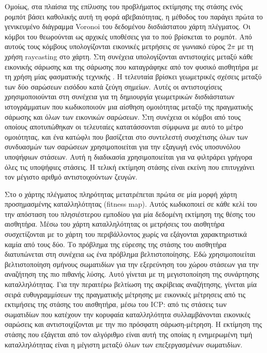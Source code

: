 Ομοίως, στα πλαίσια της επίλυσης του προβλήματος εκτίμησης της στάσης ενός
ρομπότ βάσει καθολικής αυτή τη φορά αβεβαιότητας, η μέθοδος του
\cite{Park2014a} παράγει πρώτα το γενικευμένο διάγραμμα Voronoi του δεδομένου
δισδιάστατου χάρτη πλέγματος. Οι κόμβοι του θεωρούνται ως αρχικές υποθέσεις για
το πού βρίσκεται το ρομπότ. Από αυτούς τους κόμβους υπολογίζονται εικονικές
μετρήσεις σε γωνιακό εύρος $2\pi$ με τη χρήση raycasting στο χάρτη. Στη
συνέχεια υπολογίζονται αντιστοιχίες μεταξύ κάθε εικονικής σάρωσης και της
σάρωσης που καταγράφηκε από τον φυσικό αισθητήρα με τη χρήση μίας φασματικής
τεχνικής \cite{Leordeanu2005a}. Η τελευταία βρίσκει γεωμετρικές σχέσεις μεταξύ
των δύο σαρώσεων εισόδου κατά ζεύγη σημείων. Αυτές οι αντιστοιχίσεις
χρησιμοποιούνται στη συνέχεια για τη δημιουργία γεωμετρικών δισδιάστατων
ιστογράμματων που κωδικοποιούν μια αίσθηση ομοιότητας μεταξύ της πραγματικής
σάρωσης και όλων των εικονικών σαρώσεων. Στη συνέχεια οι κόμβοι από τους
οποίους αποτυπώθηκαν οι τελευταίες κατατάσσονται σύμφωνα με αυτό το μέτρο
ομοιότητας, και ένα κατώφλι που βασίζεται στο συντελεστή συσχέτισης όλων των
συνδυασμών των σαρώσεων χρησιμοποιείται για την εξαγωγή ενός υποσυνόλου
υποψήφιων στάσεων. Αυτή η διαδικασία χρησιμοποιείται για να φιλτράρει γρήγορα
όλες τις υποψήφιες στάσεις. Η τελική εκτίμηση στάσης είναι εκείνη που
επιτυγχάνει τον μέγιστο αριθμό αντιστοιχούντων ζευγών.

Στο \cite{Zhang2017a} ο χάρτης πλέγματος πληρότητας μετατρέπεται πρώτα σε μία
μορφή χάρτη προσημασμένης καταλληλότητας (fitness map). Αυτός κωδικοποιεί σε
κάθε κελί του την απόσταση του πλησιέστερου εμποδίου για μία δεδομένη εκτίμηση
της θέσης του αισθητήρα. Μέσω του χάρτη καταλληλότητας οι μετρήσεις του
αισθητήρα συσχετίζονται με το χάρτη του περιβάλλοντος χωρίς να εξάγονται
χαρακτηριστικά καμία από τους δύο. Το πρόβλημα της εύρεσης της στάσης του
αισθητήρα διατυπώνεται στη συνέχεια ως ένα πρόβλημα βελτιστοποίησης. Εδώ
χρησιμοποιείται βελτιστοποίηση σμήνους σωματιδίων για την εξερεύνηση του χώρου
στάσεων για την αναζήτηση της πιο πιθανής λύσης. Αυτό γίνεται με τη
μεγιστοποίηση της συνάρτησης καταλληλότητας. Για την περαιτέρω βελτίωση της
ακρίβειας αναζήτησης, γίνεται μία σειρά ευθυγραμμίσεων της πραγματικής μέτρησης
με εικονικές μέτρησεις από τις εκτιμήσεις της στάσης του αισθητήρα, μέσω του
ICP: από τις στάσεις των σωματιδίων που κατέχουν την κορυφαία καταλληλότητα
συλλαμβάνονται εικονικές σαρώσεις και αντιστοιχίζονται με την πιο πρόσφατη
σάρωση-μέτρηση.  Η εκτίμηση της στάσης που εξάγεται από τον αλγόριθμο είναι
αυτή της οποίας η ενημερωμένη τιμή καταλληλότητας είναι η μέγιστη μεταξύ όλων
των επεξεργασμένων σωματιδίων.

